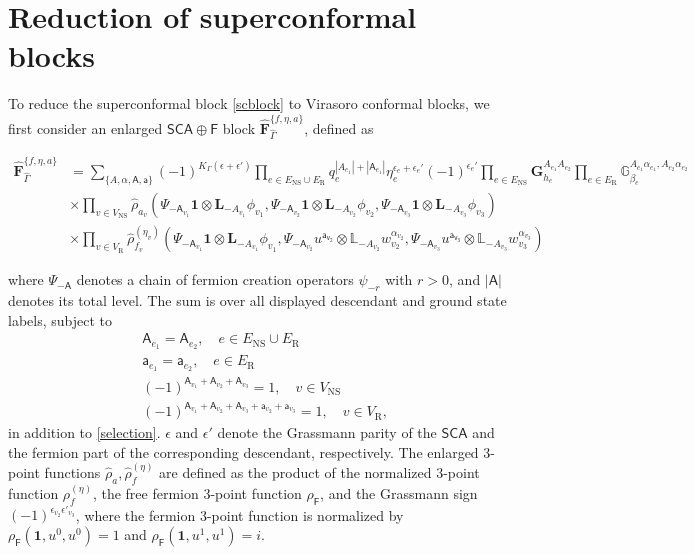 \documentclass[aps,10pt,twocolumn,superscriptaddress]{revtex4-2}
\def\ie{\begin{equation}\begin{aligned}}
\def\fe{\end{aligned}\end{equation}}
\def\NS{\mathrm{NS}}
\def\R{\mathrm{R}}
\begin{document}
\section{Reduction of superconformal blocks}

\label{sec:blockdecomp}

To reduce the superconformal block \eqref{scblock} to Virasoro conformal blocks, we first consider an enlarged $\mathsf{SCA}\oplus \mathsf{F}$ block $\widehat{\mathbf{F}}^{\{f,\eta,a\}}_{\hat{\Gamma}}$, defined as
\begin{widetext}
\ie 
\widehat{\mathbf{F}}^{\{f,\eta,a\}}_{\hat{\Gamma}} &= \sum_{\{A,\alpha,\mathsf{A},\mathsf{a}\}} (-1)^{K_\Gamma(\epsilon+\epsilon')} \prod_{e\in E_\NS\cup E_\R} q_e^{|A_{e_1}|+|\mathsf{A}_{e_1}|}\eta_e^{\epsilon_e+\epsilon_e'}(-1)^{\epsilon_e'} \prod_{e\in E_\NS} \mathbf{G}_{h_e}^{A_{e_1}A_{e_2}} \prod_{e\in E_\R} \mathbb{G}_{\beta_e}^{A_{e_1}\alpha_{e_1},A_{e_2}\alpha_{e_2}}\\
&\times \prod_{v \in V_\NS} \hat{\rho}_{a_v}(\Psi_{-\mathsf{A}_{v_1}}\mathbf{1}\otimes \mathbf L_{-A_{v_1}}\phi_{v_1},\Psi_{-\mathsf{A}_{v_2}}\mathbf{1}\otimes \mathbf L_{-A_{v_2}}\phi_{v_2},\Psi_{-\mathsf{A}_{v_3}}\mathbf{1}\otimes \mathbf L_{-A_{v_3}}\phi_{v_3})\\
&\times\prod_{v\in V_\R}\hat{\rho}_{f_v}^{(\eta_v)}(\Psi_{-\mathsf{A}_{v_1}}\mathbf{1}\otimes \mathbf L_{-A_{v_1}}\phi_{v_1},\Psi_{-\mathsf{A}_{v_2}} u^{\mathsf{a_{v_2}}}\otimes\mathbb L_{-A_{v_2}}w_{v_2}^{\alpha_{v_2}},\Psi_{-\mathsf{A}_{v_3}} u^{\mathsf{a_{v_3}}}\otimes\mathbb L_{-A_{v_3}}w_{v_3}^{\alpha_{v_3}})
\fe
\end{widetext}
where $\Psi_{-\mathsf{A}}$ denotes a chain of fermion creation operators $\psi_{-r}$ with $r>0$, and $|\mathsf{A}|$ denotes its total level. The sum is over all displayed descendant and ground state labels, subject to
\ie \label{Fselection}
&\mathsf{A}_{e_1} = \mathsf{A}_{e_2},\quad e\in E_{\NS}\cup E_\R\\
&\mathsf{a}_{e_1} = \mathsf{a}_{e_2},\quad e\in E_\R\\
&(-1)^{\mathsf{A}_{v_1}+\mathsf{A}_{v_2}+\mathsf{A}_{v_3}} = 1,\quad v\in V_{\NS}\\
&(-1)^{\mathsf{A}_{v_1}+\mathsf{A}_{v_2}+\mathsf{A}_{v_3}+\mathsf{a}_{v_2}+\mathsf{a}_{v_3}} = 1,\quad v\in V_{\R},
\fe
in addition to \eqref{selection}. $\epsilon$ and $\epsilon'$ denote the Grassmann parity of the $\mathsf{SCA}$ and the fermion part of the corresponding descendant, respectively. The enlarged 3-point functions $\hat{\rho}_a, \hat{\rho}_f^{(\eta)}$ are defined as the product of the normalized 3-point function $\rho^{(\eta)}_f$, the free fermion 3-point function $\rho_\mathsf{F}$, and the Grassmann sign $(-1)^{\epsilon_{v_2}\epsilon'_{v_3}}$, where the fermion 3-point function is normalized by $\rho_{\mathsf{F}}(\mathbf{1},u^0,u^0)=1$ and $\rho_{\mathsf{F}}(\mathbf{1},u^1,u^1)=i$.
\end{document}
